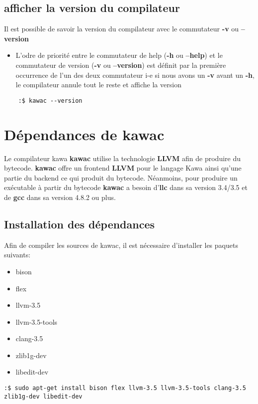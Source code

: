 \documentclass{../res/univ-projet}
\begin{document}
  \subsection{afficher la version du compilateur}
    Il est possible de savoir la version du compilateur avec le commutateur \textbf{-v} ou \textbf{--version}
    \begin{itemize}
      \item L’odre de priorité entre le commutateur de help (\textbf{-h} ou \textbf{--help}) et le commutateur de version (\textbf{-v} ou \textbf{--version}) est définit par la première occurrence de l’un des deux commutateur i-e si nous avons un \textbf{-v}
      avant un \textbf{-h}, le compilateur annule tout le reste et affiche la version
  \end{itemize}
  \begin{verbatim}
    :$ kawac --version
  \end{verbatim}

 \section{Dépendances de kawac}
  Le compilateur kawa \textbf{kawac} utilise la technologie \textbf{LLVM} afin de produire du bytecode. \textbf{kawac} offre un frontend \textbf{LLVM} pour le langage Kawa ainsi qu'une partie du backend ce qui produit du bytecode. Néanmoins, pour produire un exécutable à partir du bytecode \textbf{kawac} a besoin d'\textbf{llc} dans sa version 3.4/3.5 et de \textbf{gcc} dans sa version 4.8.2 ou plus.

	\subsection{Installation des dépendances}
		Afin de compiler les sources de kawac, il est nécessaire d'installer les paquets suivants:
		\begin{itemize}
			\item bison
			\item flex
			\item llvm-3.5
			\item llvm-3.5-tools
			\item clang-3.5
			\item zlib1g-dev 
			\item libedit-dev
		\end{itemize}
                \begin{verbatim}
:$ sudo apt-get install bison flex llvm-3.5 llvm-3.5-tools clang-3.5 zlib1g-dev libedit-dev
\end{verbatim}
\end{document}
